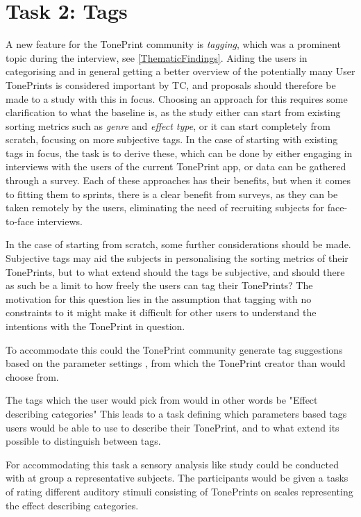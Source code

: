 \section{Task 2: Tags}
\label{Task2}
A new feature for the TonePrint community is \textit{tagging}, which was a prominent topic during the interview, see \autoref{ThematicFindings}. Aiding the users in categorising and in general getting a better overview of the potentially many User TonePrints is considered important by TC, and proposals should therefore be made to a study with this in focus. Choosing an approach for this requires some clarification to what the baseline is, as the study either can start from existing sorting metrics such as \textit{genre} and \textit{effect type}, or it can start completely from scratch, focusing on more subjective tags. In the case of starting with existing tags in focus, the task is to derive these, which can be done by either engaging in interviews with the users of the current TonePrint app, or data can be gathered through a survey. Each of these approaches has their benefits, but when it comes to fitting them to sprints, there is a clear benefit from surveys, as they can be taken remotely by the users, eliminating the need of recruiting subjects for face-to-face interviews.

In the case of starting from scratch, some further considerations should be made. Subjective tags may aid the subjects in personalising the sorting metrics of their TonePrints, but to what extend should the tags be subjective, and should there as such be a limit to how freely the users can tag their TonePrints? The motivation for this question lies in the assumption that tagging with no constraints to it might make it difficult for other users to understand the intentions with the TonePrint in question. \\

\noindent




To accommodate this could the TonePrint community generate tag suggestions based on the parameter settings , from which the TonePrint creator than would choose from.

The tags which the user would pick from would in other words be "Effect describing categories" This leads to a task defining which parameters based tags users would be able to use to describe their TonePrint, and to what extend its possible to distinguish between tags.

\noindent
For accommodating this task a sensory analysis like study could be conducted with at group a representative subjects. The participants would be given a tasks of rating different auditory stimuli consisting of TonePrints on scales representing the effect describing categories.

